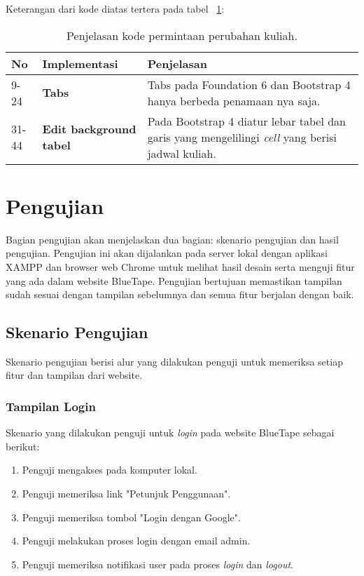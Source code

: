 Keterangan dari kode diatas tertera pada tabel ~\ref{tabel:lst:lihatJadwalDosen}:
\begin{table}[H]
	\centering
	\caption{Penjelasan kode permintaan perubahan kuliah.}
	\label{tabel:lst:lihatJadwalDosen}
	\begin{tabularx}{\textwidth}{llX}
		\toprule
		No & Implementasi     & Penjelasan \\
		\midrule
		9-24 & \textbf{Tabs}  & Tabs pada Foundation 6 dan Bootstrap 4 hanya berbeda penamaan nya saja.\\
		31-44 & \textbf{Edit background tabel}  & Pada Bootstrap 4 diatur lebar tabel dan garis yang mengelilingi \textit{cell} yang berisi jadwal kuliah.\\
		\bottomrule
	\end{tabularx}%

\end{table}
\section{Pengujian}
Bagian pengujian akan menjelaskan dua bagian: skenario pengujian dan hasil pengujian. Pengujian ini akan dijalankan pada server lokal dengan aplikasi XAMPP dan browser web Chrome untuk melihat hasil desain serta menguji fitur yang ada dalam website BlueTape. Pengujian bertujuan memastikan tampilan sudah sesuai dengan tampilan sebelumnya dan semua fitur berjalan dengan baik.
\subsection{Skenario Pengujian}
Skenario pengujian berisi alur yang dilakukan penguji untuk memeriksa setiap fitur dan tampilan dari website. 
\subsubsection{Tampilan Login}
Skenario yang dilakukan penguji untuk \textit{login} pada website BlueTape sebagai berikut:
\begin{enumerate}
	\item Penguji mengakses  pada komputer lokal.
	\item Penguji memeriksa link "Petunjuk Penggunaan".
	\item Penguji memeriksa tombol "Login dengan Google".
	\item Penguji melakukan proses login dengan email admin.
	\item Penguji memeriksa notifikasi user pada proses \textit{login} dan \textit{logout}.	
\end{enumerate}
